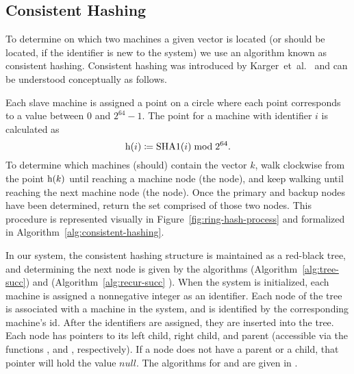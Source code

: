 \subsection{Consistent Hashing}
To determine on which two machines a given vector is located (or should be
located, if the identifier is new to the system) we use an algorithm known as
consistent hashing. Consistent hashing was introduced by
Karger~et~al.~\cite{karger1997} and can be understood conceptually as follows.
\par
Each slave machine is assigned a point on a circle where each point corresponds
to a value between \(0\) and \(2^{64} - 1\). The point for a machine with
identifier \(i\) is calculated as
\begin{equation*}
    \mathrm{h}(i) \coloneqq \mathrm{SHA1}(i) \bmod{2^{64}}.
\end{equation*}
To determine which machines (should) contain the vector \(k\), walk clockwise
from the point \(\mathrm{h}(k)\) until reaching a machine node (the
 node), and keep walking until reaching the next machine node
(the  node). Once the primary and backup nodes have been
determined, return the set comprised of those two nodes. This procedure is
represented visually in Figure~\ref{fig:ring-hash-process} and formalized in
Algorithm~\ref{alg:consistent-hashing}.
%
\par
In our system, the consistent hashing structure is maintained as a red-black
tree, and determining the next node is given by the algorithms
 (Algorithm~\ref{alg:tree-succ}) and
 (Algorithm~\ref{alg:recur-succ}
\cite{bstPredecessorSuccessor}). When the system is initialized, each machine
is assigned a nonnegative integer as an identifier. Each node of the tree is
associated with a machine in the system, and is identified by the corresponding
machine's id. After the identifiers are assigned, they are inserted into the
tree. Each node has pointers to its left child, right child, and parent
(accessible via the functions ,  and
, respectively). If a node does not have a parent or a child,
that pointer will hold the value \(null\). The algorithms for
 and  are given in \cite{cormen2009}.
%
